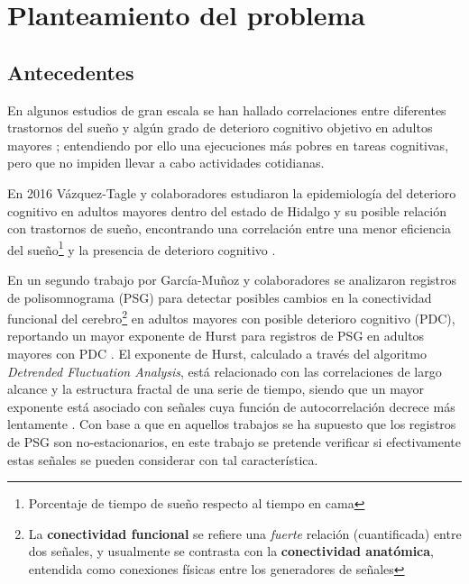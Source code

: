 \chapter{Planteamiento del problema}

\section{Antecedentes}

En algunos estudios de gran escala se han hallado correlaciones entre diferentes trastornos del 
sueño y algún grado de deterioro cognitivo objetivo en adultos mayores 
\cite{Amer13,Miyata13,Reid06,Potvin12}; entendiendo por ello una ejecuciones más pobres en tareas
cognitivas, pero que no impiden llevar a cabo actividades cotidianas.

En 2016 Vázquez-Tagle y colaboradores estudiaron la epidemiología del deterioro cognitivo en 
adultos mayores dentro del estado de Hidalgo y su posible relación con trastornos de sueño, 
encontrando una correlación entre una menor eficiencia del sueño\footnote{Porcentaje de tiempo
de sueño respecto al tiempo en cama} y la presencia de deterioro cognitivo \cite{VazquezTagle16}.

En un segundo trabajo por García-Muñoz y colaboradores \cite{Valeria} se analizaron 
registros de polisomnograma (PSG) 
para detectar posibles cambios en la conectividad funcional del cerebro\footnote{La 
\textbf{conectividad funcional} se refiere una \textit{fuerte} relación (cuantificada) entre dos 
señales, y usualmente se contrasta con la \textbf{conectividad anatómica}, entendida como conexiones 
físicas entre los generadores de señales} en adultos mayores con posible deterioro 
cognitivo (PDC), reportando un mayor exponente de Hurst para registros de PSG en adultos mayores 
con PDC \cite{Valeria}.
El exponente de Hurst, calculado a través del algoritmo \textit{Detrended Fluctuation Analysis}, 
está relacionado con las correlaciones de largo alcance y la estructura fractal de una serie de 
tiempo, siendo que un mayor exponente está asociado con señales cuya función de 
autocorrelación decrece más lentamente \cite{Rodriguez11}.
Con base a que en aquellos trabajos se ha supuesto que los registros de PSG son no-estacionarios, 
en este trabajo se pretende verificar si efectivamente estas señales se pueden considerar con tal
característica.

